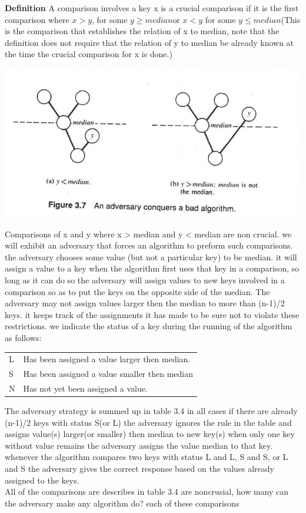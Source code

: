 \documentclass[a4paper,10pt,titlepage]{report}
\begin{document}
\textbf{Definition} A comparison involves a key x is a crucial comparison if it is the first comparison where $x>y$, for some $y \geq median $or $x < y$ for some $y \leq median$(This is the comparison that establishes the relation of x to median, note that the definition does not require that the relation of y to median be already known at the time the crucial comparison for x is done.)


\includegraphics[scale=0.4]{notes_3_7.png}

Comparisons of x and y where x > median and y < median are non crucial. we will exhibit an adversary that forces an algorithm to preform such comparisons. the adversary chooses some value (but not a particular key) to be median. it will assign a value to a key when the algorithm first uses that key in a comparison, so long as it can do so the adversary will assign values to new keys involved in a comparison so as to put the keys on the opposite side of the median. The adversary may not assign values larger then the median to more than (n-1)/2 keys. it keeps track of the assignments it has made to be sure not to violate these restrictions. we indicate the status of a key during the running of the algorithm as follows:\\
\begin{tabular}{ll}
L & Has been assigned a value larger then median. \\
S & Has been assigned a value smaller then median \\
N & Has not yet been assigned a value.
\end{tabular}
\vspace{5mm}
The adversary strategy is summed up in table 3.4 in all cases if there are already (n-1)/2 keys with status S(or L) the adversary ignores the rule in the table and assigns value(s) larger(or smaller) then median to new key(s) when only one key without value remains the adversary assigns the value median to that key. whenever the algorithm compares two keys with status L and L, S and S, or L and S the adversary gives the correct response based on the values already assigned to the keys.\\
All of the comparisons are describes in table 3.4 are noncrusial, how many can the adversary make any algorithm do? each of these comparisons 
\end{document}
